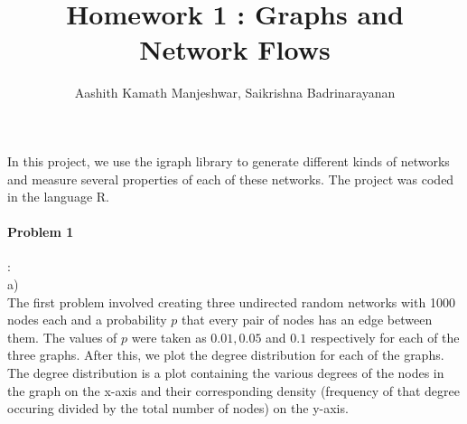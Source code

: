 \documentclass{article}
\title{Homework 1 : Graphs and Network Flows}
\author{Aashith Kamath Manjeshwar, Saikrishna Badrinarayanan}
\begin{document}
\maketitle

In this project, we use the igraph library to generate different kinds of networks and measure several properties of 
each of these networks. The project was coded in the language R.

\paragraph{Problem 1}: \\
a)\\
The first problem involved creating three undirected random networks with 1000 nodes each and a probability $p$ that
every pair of nodes has an edge between them. The values of $p$ were taken as $0.01,0.05$ and $0.1$
respectively for each of the three graphs. After this, we plot the degree distribution for each of the graphs.
The degree distribution is a plot containing the various degrees of the nodes in the graph on the x-axis
and their corresponding density (frequency of that degree occuring divided by the total number of nodes) on the y-axis.\\
\end{document}
